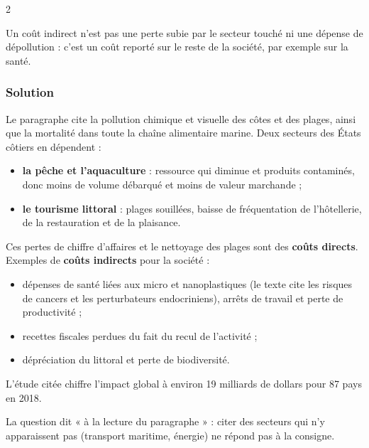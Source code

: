 \documentclass[11pt,a4paper]{article}
\providecommand{\tightlist}{\setlength{\itemsep}{0pt}\setlength{\parskip}{0pt}}
\begin{document}
\begin{indication}{2}

Un coût indirect n'est pas une perte subie par le secteur touché ni une dépense de dépollution : c'est un coût reporté sur le reste de la société, par exemple sur la santé.

\end{indication}

\hypertarget{solution}{%
\subsubsection{Solution}\label{solution}}

Le paragraphe cite la pollution chimique et visuelle des côtes et des plages, ainsi que la mortalité dans toute la chaîne alimentaire marine. Deux secteurs des États côtiers en dépendent :

\begin{itemize}
\tightlist
\item
  \textbf{la pêche et l'aquaculture} : ressource qui diminue et produits contaminés, donc moins de volume débarqué et moins de valeur marchande ;
\item
  \textbf{le tourisme littoral} : plages souillées, baisse de fréquentation de l'hôtellerie, de la restauration et de la plaisance.
\end{itemize}

Ces pertes de chiffre d'affaires et le nettoyage des plages sont des \textbf{coûts directs}. Exemples de \textbf{coûts indirects} pour la société :

\begin{itemize}
\tightlist
\item
  dépenses de santé liées aux micro et nanoplastiques (le texte cite les risques de cancers et les perturbateurs endocriniens), arrêts de travail et perte de productivité ;
\item
  recettes fiscales perdues du fait du recul de l'activité ;
\item
  dépréciation du littoral et perte de biodiversité.
\end{itemize}

L'étude citée chiffre l'impact global à environ 19 milliards de dollars pour 87 pays en 2018.

\begin{piege}

La question dit « à la lecture du paragraphe » : citer des secteurs qui n'y apparaissent pas (transport maritime, énergie) ne répond pas à la consigne.

\end{piege}
\end{document}
